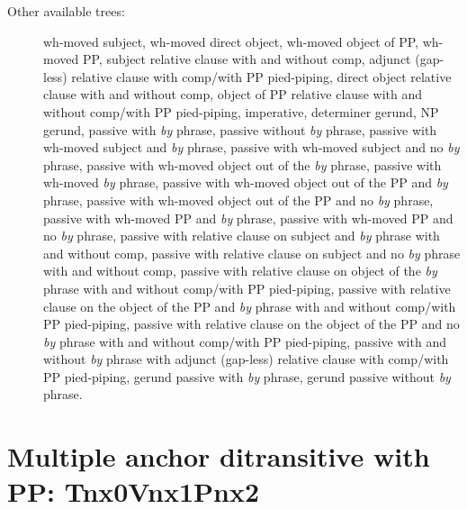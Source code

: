 \begin{description}
\item[Other available trees:] wh-moved subject, wh-moved direct object, 
wh-moved object of PP, wh-moved PP, subject relative clause with and without comp, 
adjunct (gap-less) relative clause with comp/with PP pied-piping, direct object 
relative clause with and without comp, object of PP relative clause with and 
without comp/with PP pied-piping, imperative, determiner 
gerund, NP gerund, passive with {\it by} phrase, passive without {\it by} 
phrase, passive with wh-moved subject and {\it by} phrase, passive with 
wh-moved subject and no {\it by} phrase, passive with wh-moved object out 
of the {\it by} phrase, passive with wh-moved {\it by} phrase, passive with 
wh-moved object out of the PP and {\it by} phrase, passive with wh-moved 
object out of the PP and no {\it by} phrase, passive with wh-moved PP and 
{\it by} phrase, passive with wh-moved PP and no {\it by} phrase, passive 
with relative clause on subject and {\it by} phrase with and without comp, 
passive with relative 
clause on subject and no {\it by} phrase with and without comp, passive with relative clause on 
object of the {\it by} phrase with and without comp/with PP pied-piping, 
passive with relative clause on the object 
of the PP and {\it by} phrase with and without comp/with PP pied-piping, 
passive with relative clause on the object 
of the PP and no {\it by} phrase with and without comp/with PP pied-piping, 
passive with and without {\it by} phrase with adjunct (gap-less) relative clause 
with comp/with PP pied-piping, 
gerund passive with {\it by} phrase, 
gerund passive without {\it by} phrase. 
 
\end{description} 
 
 
 
\section{Multiple anchor ditransitive with PP: Tnx0Vnx1Pnx2} 
\label{nx0Vnx1Pnx2-family} 
 
